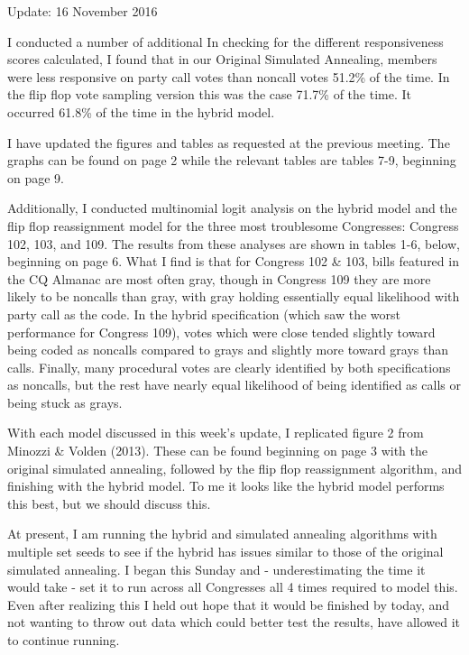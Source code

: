 \documentclass[12pt]{article}
\begin{document}
	
	\begin{center}
		Update: 16 November 2016
	\end{center}

I conducted a number of additional  In checking for the different responsiveness scores calculated, I found that in our Original Simulated Annealing, members were less responsive on party call votes than noncall votes 51.2\% of the time. In the flip flop vote sampling version this was the case 71.7\% of the time. It occurred 61.8\% of the time in the hybrid model.

I have updated the figures and tables as requested at the previous meeting. The graphs can be found on page 2 while the relevant tables are tables 7-9, beginning on page 9.

Additionally, I conducted multinomial logit analysis on the hybrid model and the flip flop reassignment model for the three most troublesome Congresses: Congress 102, 103, and 109. The results from these analyses are shown in tables 1-6, below, beginning on page 6. What I find is that for Congress 102 \& 103, bills featured in the CQ Almanac are most often gray, though in Congress 109 they are more likely to be noncalls than gray, with gray holding essentially equal likelihood with party call as the code. In the hybrid specification (which saw the worst performance for Congress 109), votes which were close tended slightly toward being coded as noncalls compared to grays and slightly more toward grays than calls. Finally, many procedural votes are clearly identified by both specifications as noncalls, but the rest have nearly equal likelihood of being identified as calls or being stuck as grays.

With each model discussed in this week's update, I replicated figure 2 from Minozzi \& Volden (2013). These can be found beginning on page 3 with the original simulated annealing, followed by the flip flop reassignment algorithm, and finishing with the hybrid model. To me it looks like the hybrid model performs this best, but we should discuss this.

At present, I am running the hybrid and simulated annealing algorithms with multiple set seeds to see if the hybrid has issues similar to those of the original simulated annealing. I began this Sunday and - underestimating the time it would take - set it to run across all Congresses all 4 times required to model this. Even after realizing this I held out hope that it would be finished by today, and not wanting to throw out data which could better test the results, have allowed it to continue running. 
\end{document}
